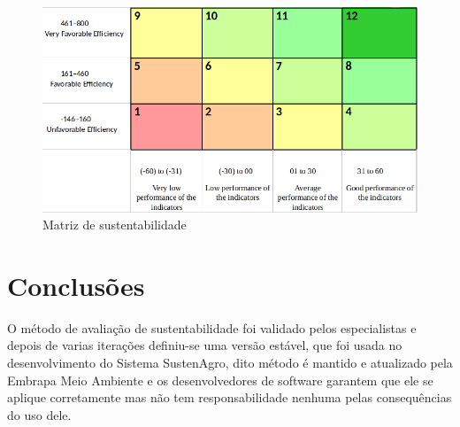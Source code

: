\begin{figure}[h]
\includegraphics[width=0.8\columnwidth]{figures/SustaiabilityMatrixDesign}

\caption{Matriz de sustentabilidade \label{fig:Matriz-de-sustentabilidade}}

\end{figure}


\section{Conclusões}

O método de avaliação de sustentabilidade foi validado pelos especialistas
e depois de varias iterações definiu-se uma versão estável, que foi
usada no desenvolvimento do Sistema SustenAgro, dito método é mantido
e atualizado pela Embrapa Meio Ambiente e os desenvolvedores de software
garantem que ele se aplique corretamente mas não tem responsabilidade
nenhuma pelas consequências do uso dele.
